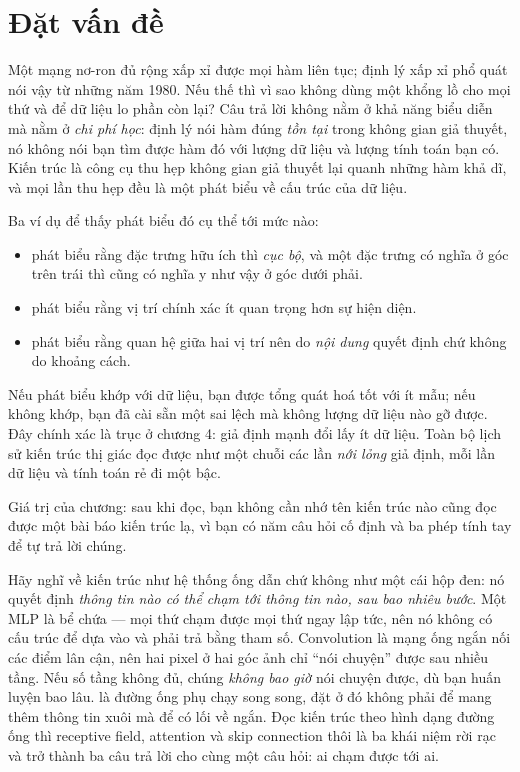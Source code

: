 \documentclass[../../deep_learning.tex]{subfiles}
\begin{document}
\section{Đặt vấn đề}

Một mạng nơ-ron đủ rộng xấp xỉ được mọi hàm liên tục; định lý xấp xỉ phổ quát nói vậy từ những năm 1980. Nếu thế thì vì sao không dùng một  khổng lồ cho mọi thứ và để dữ liệu lo phần còn lại? Câu trả lời không nằm ở khả năng biểu diễn mà nằm ở \emph{chi phí học}: định lý nói hàm đúng \emph{tồn tại} trong không gian giả thuyết, nó không nói bạn tìm được hàm đó với lượng dữ liệu và lượng tính toán bạn có. Kiến trúc là công cụ thu hẹp không gian giả thuyết lại quanh những hàm khả dĩ, và mọi lần thu hẹp đều là một phát biểu về cấu trúc của dữ liệu.

Ba ví dụ để thấy phát biểu đó cụ thể tới mức nào:

\begin{itemize}
\item \textbf{} phát biểu rằng đặc trưng hữu ích thì \emph{cục bộ}, và một đặc trưng có nghĩa ở góc trên trái thì cũng có nghĩa y như vậy ở góc dưới phải.
\item \textbf{} phát biểu rằng vị trí chính xác ít quan trọng hơn sự hiện diện.
\item \textbf{} phát biểu rằng quan hệ giữa hai vị trí nên do \emph{nội dung} quyết định chứ không do khoảng cách.
\end{itemize}

Nếu phát biểu khớp với dữ liệu, bạn được tổng quát hoá tốt với ít mẫu; nếu không khớp, bạn đã cài sẵn một sai lệch mà không lượng dữ liệu nào gỡ được. Đây chính xác là trục ở chương 4: giả định mạnh đổi lấy ít dữ liệu. Toàn bộ lịch sử kiến trúc thị giác đọc được như một chuỗi các lần \emph{nới lỏng} giả định, mỗi lần dữ liệu và tính toán rẻ đi một bậc.

Giá trị của chương: sau khi đọc, bạn không cần nhớ tên kiến trúc nào cũng đọc được một bài báo kiến trúc lạ, vì bạn có năm câu hỏi cố định và ba phép tính tay để tự trả lời chúng.

\begin{trucgiac}
Hãy nghĩ về kiến trúc như hệ thống ống dẫn chứ không như một cái hộp đen: nó quyết định \emph{thông tin nào có thể chạm tới thông tin nào, sau bao nhiêu bước}. Một MLP là bể chứa --- mọi thứ chạm được mọi thứ ngay lập tức, nên nó không có cấu trúc để dựa vào và phải trả bằng tham số. Convolution là mạng ống ngắn nối các điểm lân cận, nên hai pixel ở hai góc ảnh chỉ ``nói chuyện'' được sau nhiều tầng. Nếu số tầng không đủ, chúng \emph{không bao giờ} nói chuyện được, dù bạn huấn luyện bao lâu.  là đường ống phụ chạy song song, đặt ở đó không phải để mang thêm thông tin xuôi mà để  có lối về ngắn. Đọc kiến trúc theo hình dạng đường ống thì receptive field, attention và skip connection thôi là ba khái niệm rời rạc và trở thành ba câu trả lời cho cùng một câu hỏi: ai chạm được tới ai.
\end{trucgiac}
\end{document}
